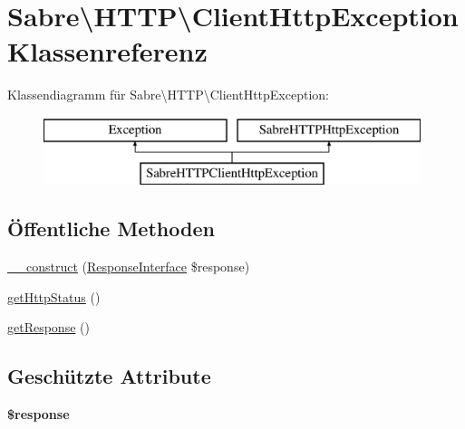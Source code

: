 \hypertarget{class_sabre_1_1_h_t_t_p_1_1_client_http_exception}{}\section{Sabre\textbackslash{}H\+T\+TP\textbackslash{}Client\+Http\+Exception Klassenreferenz}
\label{class_sabre_1_1_h_t_t_p_1_1_client_http_exception}
Klassendiagramm für Sabre\textbackslash{}H\+T\+TP\textbackslash{}Client\+Http\+Exception\+:\begin{figure}[H]
\begin{center}
\leavevmode
\includegraphics[height=2.000000cm]{class_sabre_1_1_h_t_t_p_1_1_client_http_exception}
\end{center}
\end{figure}
\subsection*{Öffentliche Methoden}
\begin{DoxyCompactItemize}
\item 
\mbox{\hyperlink{class_sabre_1_1_h_t_t_p_1_1_client_http_exception_ae9d812bde55cce7d2c6445c83153d14b}{\+\_\+\+\_\+construct}} (\mbox{\hyperlink{interface_sabre_1_1_h_t_t_p_1_1_response_interface}{Response\+Interface}} \$response)
\item 
\mbox{\hyperlink{class_sabre_1_1_h_t_t_p_1_1_client_http_exception_a1112cedae2996f53423d24c2f0193a12}{get\+Http\+Status}} ()
\item 
\mbox{\hyperlink{class_sabre_1_1_h_t_t_p_1_1_client_http_exception_a4fe80b9618406e2abdeccd0ff027f665}{get\+Response}} ()
\end{DoxyCompactItemize}
\subsection*{Geschützte Attribute}
\begin{DoxyCompactItemize}
\item 
\mbox{\label{class_sabre_1_1_h_t_t_p_1_1_client_http_exception_a0cfe1a15aa0fd43cbb894a35c5c8004d}} 
{\bfseries \$response}
\end{DoxyCompactItemize}



